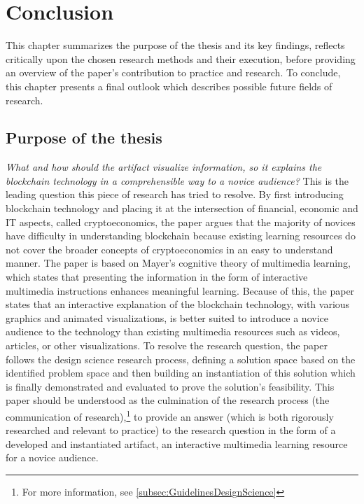 \chapter{Conclusion} \label{chap:conclusion}

This chapter summarizes the purpose of the thesis and its key findings, reflects critically upon the chosen research methods and their execution, before providing an overview of the paper's contribution to practice and research. To conclude, this chapter presents a final outlook which describes possible future fields of research. 

\section{Purpose of the thesis} \label{sec:findings}
\textit{What and how should the artifact visualize information, so it explains the blockchain technology in a comprehensible way to a novice audience?} This is the leading question this piece of research has tried to resolve. By first introducing blockchain technology and placing it at the intersection of financial, economic and \ac{IT} aspects, called cryptoeconomics, the paper argues that the majority of novices have difficulty in understanding blockchain because existing learning resources do not cover the broader concepts of cryptoeconomics in an easy to understand manner. The paper is based on Mayer's cognitive theory of multimedia learning, which states that presenting the information in the form of interactive multimedia instructions enhances meaningful learning. Because of this, the paper states that an interactive explanation of the blockchain technology, with various graphics and animated visualizations, is better suited to introduce a novice audience to the technology than existing multimedia resources such as videos, articles, or other visualizations. To resolve the research question, the paper follows the design science research process, defining a solution space based on the identified problem space and then building an instantiation of this solution which is finally demonstrated and evaluated to prove the solution's feasibility. This paper should be understood as the culmination of the research process (the communication of research),\footnote{For more information, see \ref{subsec:GuidelinesDesignScience}} to provide an answer (which is both rigorously researched and relevant to practice) to the research question in the form of a developed and instantiated artifact, an interactive multimedia learning resource for a novice audience. 


